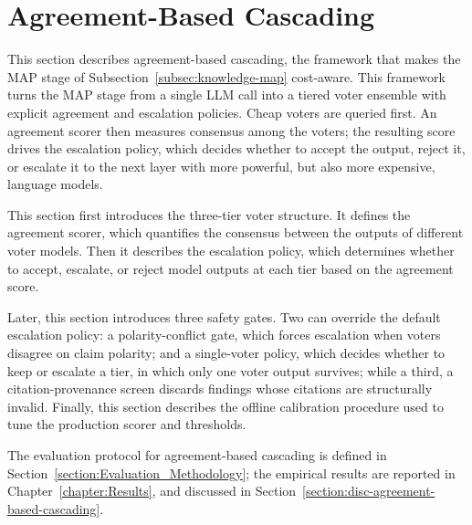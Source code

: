 \section{Agreement-Based Cascading}\label{section:Agreement_Based_Cascading}

\makeatletter
{}
\makeatother

This section describes agreement-based cascading, the framework that makes the MAP stage of Subsection~\ref{subsec:knowledge-map} cost-aware. This framework turns the MAP stage from a single LLM call into a tiered voter ensemble with explicit agreement and escalation policies. Cheap voters are queried first. An agreement scorer then measures consensus among the voters; the resulting score drives the escalation policy, which decides whether to accept the output, reject it, or escalate it to the next layer with more powerful, but also more expensive, language models. 

This section first introduces the three-tier voter structure. It defines the agreement scorer, which quantifies the consensus between the outputs of different voter models. Then it describes the escalation policy, which determines whether to accept, escalate, or reject model outputs at each tier based on the agreement score. 

Later, this section introduces three safety gates. Two can override the default escalation policy: a polarity-conflict gate, which forces escalation when voters disagree on claim polarity; and a single-voter policy, which decides whether to keep or escalate a tier, in which only one voter output survives; while a third, a citation-provenance screen discards findings whose citations are structurally invalid. Finally, this section describes the offline calibration procedure used to tune the production scorer and thresholds. 

The evaluation protocol for agreement-based cascading is defined in Section~\ref{section:Evaluation_Methodology}; the empirical results are reported in Chapter~\ref{chapter:Results}, and discussed in Section~\ref{section:disc-agreement-based-cascading}.









% 